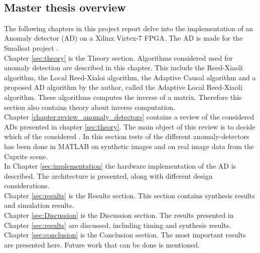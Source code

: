 
\\





\newpage
\subsection{Master thesis overview}
The following chapters in this project report delve into the implementation of an Anomaly detector (AD) on a Xilinx Virtex-7 FPGA. The AD is made for the Smallsat project \cite{SmallSat_project_description}. \\  

Chapter \ref{sec:theory} is the Theory section. Algorithms considered used for anomaly detection are described in this chapter. This include the Reed-Xiaoli algorithm, the Local Reed-Xialoi algorithm, the Adaptive Causal algorithm and a proposed AD algorithm by the author, called the Adaptive Local Reed-Xiaoli algorithm. These algorithms computes the inverse of a matrix. Therefore this section also contains theory about inverse computation.\\%


Chapter \ref{chapter:review_anomaly_detectors} contains a review of the considered ADs presented in chapter \ref{sec:theory}. The main object of this review is to decide which of the considered . In this section tests of the different anomaly-detectors has been done in MATLAB on synthetic images and on real image data from the Cuprite scene.\\  

In Chapter \ref{sec:implementation} the hardware implementation of the AD is described. The architecture is presented, along with different design considerations. \\

Chapter \ref{sec:results} is the Results section. This section contains synthesis results and simulation results.
\\

Chapter \ref{sec:Discussion} is the Discussion section. The results presented in Chapter \ref{sec:results} are discussed, including timing and synthesis results.
\\

Chapter \ref{sec:conclusion} is the Conclusion section. The most important results are presented here.  Future work that can be done is mentioned.
\\




